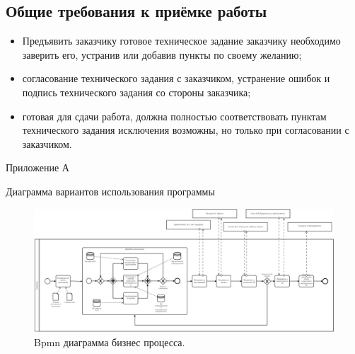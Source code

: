 \documentclass[14pt]{extarticle}
\begin{document}
\subsection {  Общие требования к приёмке работы}
\begin{itemize} 
    \item Предъявить заказчику готовое техническое задание заказчику необходимо заверить его, устранив или добавив пункты по своему желанию;
    \item согласование технического задания с заказчиком, устранение ошибок и подпись технического задания со стороны заказчика;
    \item готовая для сдачи работа, должна полностью соответствовать пунктам технического задания исключения возможны, но только при согласовании с заказчиком. 
\end{itemize}

\newpage

Приложение А \\
\par Диаграмма вариантов использования программы
\begin{figure}[h]
\begin{center}
\includegraphics[width=500]{lab6}
\caption{Bpmn диаграмма бизнес процесса.}
\label{ris:experimoriginal} 
\end{center}
\end{figure}

\label{sec:purpose}
\end{document}
